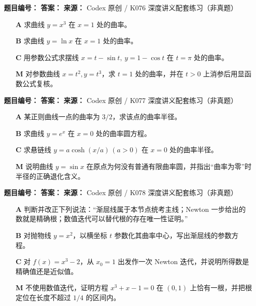 \begin{problemBox}
\begin{problemMeta}
\textbf{题目编号：}  \quad
\textbf{答案：}  \quad
\textbf{来源：} Codex 原创 / K076 深度讲义配套练习（非真题）
\end{problemMeta}
\begin{enumerate}
  \item[\textbf{A}] 求曲线 \(y=x^3\) 在 \(x=1\) 处的曲率。
  \item[\textbf{B}] 求曲线 \(y=\ln x\) 在 \(x=1\) 处的曲率。
  \item[\textbf{C}] 用参数公式求摆线 \(x=t-\sin t,\ y=1-\cos t\) 在 \(t=\pi\) 处的曲率。
  \item[\textbf{M}] 对参数曲线 \(x=t^2,y=t^3\)，求 \(t=1\) 处的曲率，并在 \(t>0\) 上消参后用显函数公式复核。
\end{enumerate}
\end{problemBox}

\begin{problemBox}
\begin{problemMeta}
\textbf{题目编号：}  \quad
\textbf{答案：}  \quad
\textbf{来源：} Codex 原创 / K077 深度讲义配套练习（非真题）
\end{problemMeta}
\begin{enumerate}
  \item[\textbf{A}] 某正则曲线一点的曲率为 \(3/2\)，求该点的曲率半径。
  \item[\textbf{B}] 求曲线 \(y=e^x\) 在 \(x=0\) 处的曲率圆方程。
  \item[\textbf{C}] 求悬链线 \(y=a\cosh(x/a)\,(a>0)\) 在 \(x=0\) 处的曲率半径。
  \item[\textbf{M}] 说明曲线 \(y=\sin x\) 在原点为何没有普通有限曲率圆，并指出“曲率为零”时半径的正确退化含义。
\end{enumerate}
\end{problemBox}

\begin{problemBox}
\begin{problemMeta}
\textbf{题目编号：}  \quad
\textbf{答案：}  \quad
\textbf{来源：} Codex 原创 / K078 深度讲义配套练习（非真题）
\end{problemMeta}
\begin{enumerate}
  \item[\textbf{A}] 判断并改正下列说法：“渐屈线属于本节点统考主线；Newton 一步给出的数就是精确根；数值迭代可以替代根的存在唯一性证明。”
  \item[\textbf{B}] 对抛物线 \(y=x^2\)，以横坐标 \(t\) 参数化其曲率中心，写出渐屈线的参数方程。
  \item[\textbf{C}] 对 \(f(x)=x^3-2\)，从 \(x_0=1\) 出发作一次 Newton 迭代，并说明所得数是精确值还是近似值。
  \item[\textbf{M}] 不使用数值迭代，证明方程 \(x^3+x-1=0\) 在 \((0,1)\) 上恰有一根，并把根定位在长度不超过 \(1/4\) 的区间内。
\end{enumerate}
\end{problemBox}
